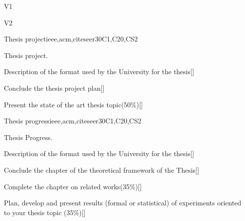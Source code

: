 \begin{syllabus}
\begin{competences}{V1}
\item {} 
\item {}
\item {}
\end{competences}

\begin{competences}{V2}
\item {} 
\item {}
\item {}
\end{competences}

\begin{unit}{Thesis project}{}{ieee,acm,citeseer}{30}{C1,C20,CS2}
   \begin{topics}
      \item Thesis project.	
   \end{topics}
   \begin{learningoutcomes}
      \item Description of the format used by the University for the thesis[\Assessment]
      \item Conclude the thesis project plan[\Assessment]
      \item Present the state of the art thesis topic(50\%)[\Assessment]
   \end{learningoutcomes}
\end{unit}

\begin{unit}{Thesis progress}{}{ieee,acm,citeseer}{30}{C1,C20,CS2}
   \begin{topics}
      \item Thesis Progress.
   \end{topics}
   \begin{learningoutcomes}
      \item Description of the format used by the University for the thesis[\Assessment]
      \item Conclude the chapter of the theoretical framework of the Thesis[\Assessment]
      \item Complete the chapter on related works(35\%)[\Assessment]
      \item Plan, develop and present results (formal or statistical) of experiments oriented to your thesis topic (35\%)[\Assessment]
   \end{learningoutcomes}
\end{unit}

\begin{coursebibliography}
\end{coursebibliography}
\end{syllabus}
